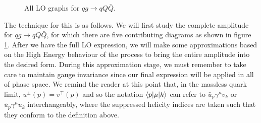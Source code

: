 \begin{figure}[t]
\caption{All LO graphs for $qg \to qQ\bar{Q}$.}
\label{fig:qg_qQQ_graphs}
\end{figure}


The technique for this is as follows. We will first study the complete amplitude for $qg \to qQ\bar{Q}$, for which there are five contributing diagrams as shown in figure \ref{fig:qg_qQQ_graphs}. After we have the full LO expression, we will make some approximations based on the High Energy behaviour of the process to bring the entire amplitude into the desired form. During this approximation stage, we must remember to take care to maintain gauge invariance since our final expression will be applied in all of phase space. We remind the reader at this point that, in the massless quark limit, $u^\pm(p) = v^\mp(p)$ and so the notation $\mathinner{\langle p\vert\mu\vert k\rangle}_{}$ can refer to $\bar{u}_p \gamma^\mu v_k$ or $\bar{u}_p \gamma^\mu u_k$ interchangeably, where the suppressed helicity indices are taken such that they conform to the definition above. 

